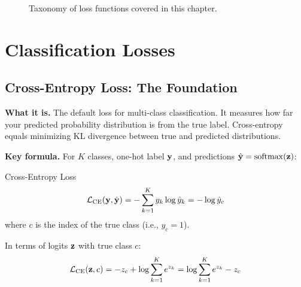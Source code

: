 \begin{figure}[H]
\caption{Taxonomy of loss functions covered in this chapter.}
\label{fig:loss_taxonomy}
\end{figure}

\section{Classification Losses}
\label{sec:classification_losses}

\subsection{Cross-Entropy Loss: The Foundation}

\textbf{What it is.} The default loss for multi-class classification. It measures how far your predicted probability distribution is from the true label. Cross-entropy equals minimizing KL divergence between true and predicted distributions.

\textbf{Key formula.} For $K$ classes, one-hot label $\mathbf{y}$, and predictions $\hat{\mathbf{y}} = \operatorname{softmax}(\mathbf{z})$:

\begin{mathresult}{Cross-Entropy Loss}
\begin{equation}
\mathcal{L}_{\text{CE}}(\mathbf{y}, \hat{\mathbf{y}}) = -\sum_{k=1}^{K} y_k \log \hat{y}_k = -\log \hat{y}_c
\end{equation}
where $c$ is the index of the true class (i.e., $y_c = 1$).
\end{mathresult}

In terms of logits $\mathbf{z}$ with true class $c$:
\begin{equation}
\mathcal{L}_{\text{CE}}(\mathbf{z}, c) = -z_c + \log\sum_{k=1}^{K} e^{z_k} = \log\sum_{k=1}^{K} e^{z_k} - z_c
\label{eq:ce_logits}
\end{equation}

